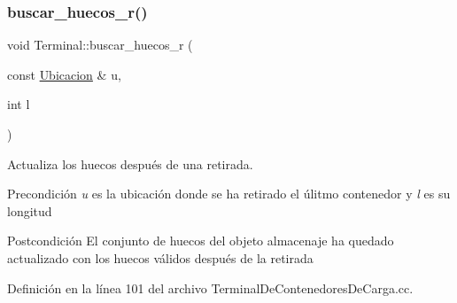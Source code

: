 \subsubsection{\texorpdfstring{buscar\+\_\+huecos\+\_\+r()}{buscar\_huecos\_r()}}
{\footnotesize\ttfamily void Terminal\+::buscar\+\_\+huecos\+\_\+r (\begin{DoxyParamCaption}\item[{const \hyperlink{class_ubicacion}{Ubicacion} \&}]{u,  }\item[{int}]{l }\end{DoxyParamCaption})\hspace{0.3cm}{\ttfamily [private]}}



Actualiza los huecos después de una retirada. 

\begin{DoxyPrecond}{Precondición}
{\itshape u} es la ubicación donde se ha retirado el úlitmo contenedor y {\itshape l} es su longitud 
\end{DoxyPrecond}
\begin{DoxyPostcond}{Postcondición}
El conjunto de huecos del objeto almacenaje ha quedado actualizado con los huecos válidos después de la retirada 
\end{DoxyPostcond}


Definición en la línea 101 del archivo Terminal\+De\+Contenedores\+De\+Carga.\+cc.


